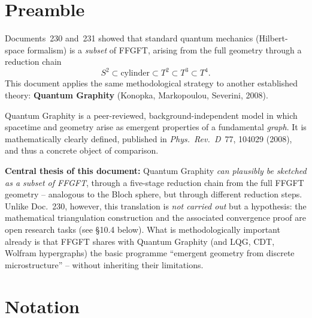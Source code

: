 
\section*{Preamble}

Documents~230 and~231 showed that standard quantum mechanics
(Hilbert-space formalism) is a \emph{subset} of FFGFT, arising from
the full geometry through a reduction chain
\[
S^2 \subset \text{cylinder} \subset T^2 \subset T^3 \subset T^4.
\]
This document applies the same methodological strategy to another
established theory: \textbf{Quantum Graphity} (Konopka, Markopoulou,
Severini, 2008).

Quantum Graphity is a peer-reviewed, background-independent model
in which spacetime and geometry arise as emergent properties of a
fundamental \emph{graph}. It is mathematically clearly defined,
published in \emph{Phys.~Rev.~D}~77, 104029 (2008), and thus a
concrete object of comparison.

\textbf{Central thesis of this document:} Quantum Graphity \emph{can
plausibly be sketched as a subset of FFGFT}, through a five-stage
reduction chain from the full FFGFT geometry -- analogous to the
Bloch sphere, but through different reduction steps. Unlike
Doc.~230, however, this translation is \emph{not carried out} but a
hypothesis: the mathematical triangulation construction and the
associated convergence proof are open research tasks (see §10.4
below). What is methodologically important already is that FFGFT
shares with Quantum Graphity (and LQG, CDT, Wolfram hypergraphs) the
basic programme \enquote{emergent geometry from discrete
microstructure} -- without inheriting their limitations.

\section*{Notation}

